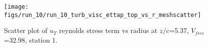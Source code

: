 \begin{figure}[H]
\centering
\texttt{[image: figs/run\_10/run\_10\_turb\_visc\_ettap\_top\_vs\_r\_meshscatter]}
\caption{Scatter plot of $
u_T$ reynolds stress term vs radius at $z/c$=5.37, $V_{free}$=32.98, station 1.}
\label{fig:run_10_turb_visc_ettap_top_vs_r_meshscatter}
\end{figure}


